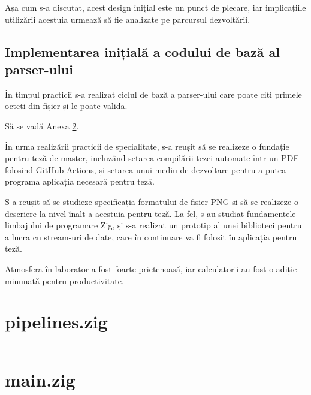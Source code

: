 \documentclass[a4paper,12pt]{report}
\begin{document}
Așa cum s-a discutat, acest design inițial este un punct de plecare,
iar implicațiile utilizării acestuia urmează să fie analizate pe parcursul dezvoltării.

\subsection{Implementarea inițială a codului de bază al parser-ului}

În timpul practicii s-a realizat ciclul de bază a parser-ului care poate citi
primele octeți din fișier și le poate valida.

Să se vadă Anexa \ref{appendix:parser_prototype}.


În urma realizării practicii de specialitate,
s-a reușit să se realizeze o fundație pentru teză de master,
incluzând setarea compilării tezei automate într-un \ac{PDF} folosind GitHub Actions,
și setarea unui mediu de dezvoltare pentru a putea programa aplicația necesară pentru teză.

S-a reușit să se studieze specificația formatului de fișier \ac{PNG}
și să se realizeze o descriere la nivel înalt a acestuia pentru teză.
La fel, s-au studiat fundamentele limbajului de programare Zig,
și s-a realizat un prototip al unei biblioteci pentru a lucra cu stream-uri de date,
care în continuare va fi folosit în aplicația pentru teză.

Atmosfera în laborator a fost foarte prietenoasă,
iar calculatorii au fost o adiție minunată pentru productivitate.

\newpage
{}




\appendix

\renewcommand{\thechapter}{\arabic{chapter}}

\setcounter{chapter}{1}


\section{pipelines.zig}\label{appendix:pipelines_prototype}
\inputminted{zig}{../src/pipelines.zig}

\clearpage\section{main.zig}\label{appendix:parser_prototype}
\inputminted{zig}{../src/main.zig}
\end{document}
